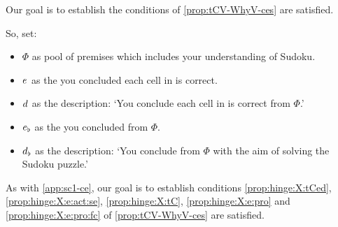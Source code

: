 \begin{note}
\begin{scenario}
\begin{figure}[h!]
\begin{subfigure}{.45\linewidth}
        \caption*{\sudokuPuzR{}}
      \end{subfigure}
    \end{figure}
    \vspace{-\baselineskip}
  \end{scenario}
\end{note}


\begin{note}
  Our goal is to establish the conditions of \autoref{prop:tCV-WhyV-ces} are satisfied.

  So, set:
  \begin{itemize}
  \item
    \(\Phi\) as pool of premises which includes your understanding of Sudoku.
  \item
    \(e\sb{}\) as the  you concluded each cell in \sudokuPuzL{} is correct.
  \item
    \(d\sb{}\) as the description: `You conclude each cell in \sudokuPuzL{} is correct from \(\Phi\).'
  \item
    \(e\sb{\flat}\) as the  you concluded \sudokuLPV{} from \(\Phi\).
  \item
    \(d\sb{\flat}\) as the description: `You conclude \sudokuLPV{} from \(\Phi\) with the aim of solving the Sudoku puzzle.'
  \end{itemize}
\end{note}

\begin{note}
  As with \autoref{app:sc1-ce}, our goal is to establish conditions \ref{prop:hinge:X:tCed}, \ref{prop:hinge:X:e:act:se}, \ref{prop:hinge:X:tC}, \ref{prop:hinge:X:e:pro} and \ref{prop:hinge:X:e:pro:fc} of \autoref{prop:tCV-WhyV-ces} are satisfied.
\end{note}

